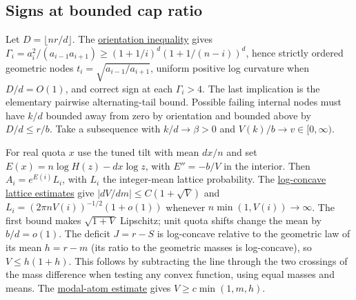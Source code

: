 \subsection{Signs at bounded cap ratio}

Let $D=\lfloor nr/d\rfloor$. The \href{https://github.com/ProgramComputer/open-math-research/blob/78e9ef2c0c0b7a5daed126efbe12a46d030d8200/topics/balanced-arrays/orientation-normalization.md}{orientation inequality} gives $\Gamma_i=a_i^2/(a_{i-1}a_{i+1})\ge(1+1/i)^d(1+1/(n-i))^d$, hence strictly ordered geometric nodes $t_i=\sqrt{a_{i-1}/a_{i+1}}$, uniform positive log curvature when $D/d=O(1)$, and correct sign at each $\Gamma_i>4$. The last implication is the elementary pairwise alternating-tail bound. Possible failing internal nodes must have $k/d$ bounded away from zero by orientation and bounded above by $D/d\le r/b$. Take a subsequence with $k/d\to\beta>0$ and $V(k)/b\to v\in[0,\infty)$.

For real quota $x$ use the tuned tilt with mean $dx/n$ and set $E(x)=n\log H(z)-dx\log z$, with $E''=-b/V$ in the interior. Then $A_i=e^{E(i)}L_i$, with $L_i$ the integer-mean lattice probability. The \href{https://github.com/ProgramComputer/open-math-research/blob/78e9ef2c0c0b7a5daed126efbe12a46d030d8200/topics/balanced-arrays/dense-regime/rank-dependent/small-variance.md}{log-concave lattice estimates} give $|dV/dm|\le C(1+\sqrt V)$ and $L_i=(2\pi nV(i))^{-1/2}(1+o(1))$ whenever $n\min(1,V(i))\to\infty$. The first bound makes $\sqrt{1+V}$ Lipschitz; unit quota shifts change the mean by $b/d=o(1)$. The deficit $J=r-S$ is log-concave relative to the geometric law of its mean $h=r-m$ (its ratio to the geometric masses is log-concave), so $V\le h(1+h)$. This follows by subtracting the line through the two crossings of the mass difference when testing any convex function, using equal masses and means. The \href{https://github.com/ProgramComputer/open-math-research/blob/04564a728c21eab6ce511b98a48ccaac754648ff/topics/balanced-arrays/very-tall/very-tall-interior-saddle.md}{modal-atom estimate} gives $V\ge c\min(1,m,h)$.

